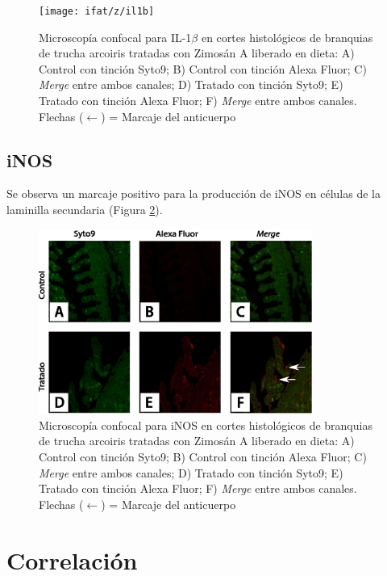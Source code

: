 \documentclass[12pt,letterpaper,oneside]{scrbook}
\begin{document}
\begin{figure}[h!]
    \centering
    \texttt{[image: ifat/z/il1b]}
    \caption[Microscopía Confocal para IL-1$\beta$]{Microscopía confocal para IL-1$\beta$ en cortes histológicos de branquias de trucha arcoiris tratadas con Zimosán A liberado en dieta:  A) Control con tinción Syto9; B) Control con tinción Alexa Fluor; C) \emph{Merge} entre ambos canales; D) Tratado con tinción Syto9; E) Tratado con tinción Alexa Fluor; F) \emph{Merge} entre ambos canales. Flechas ($\leftarrow$) = Marcaje del anticuerpo}
    \label {fig:gills:il1b}
\end{figure}

\subsection{iNOS}

Se observa un marcaje positivo para la producción de iNOS en células de
la laminilla secundaria (Figura \ref{fig:gills:inos}).

\begin{figure}[h!]
    \centering
    \includegraphics[width=0.8\textwidth]{ifat/inos}
    \caption[Microscopía Confocal para iNOS]{Microscopía confocal para iNOS en cortes histológicos de branquias de trucha arcoiris tratadas con Zimosán A liberado en dieta:  A) Control con tinción Syto9; B) Control con tinción Alexa Fluor; C) \emph{Merge} entre ambos canales; D) Tratado con tinción Syto9; E) Tratado con tinción Alexa Fluor; F) \emph{Merge} entre ambos canales. Flechas ($\leftarrow$) = Marcaje del anticuerpo}
    \label {fig:gills:inos}
\end{figure}

\clearpage

\section{Correlación}
\end{document}
